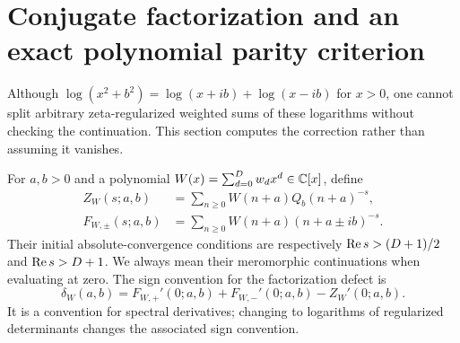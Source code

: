 \section{Conjugate factorization and an exact polynomial parity criterion}
\label{qspec:sec:anomaly}

Although $\log(x^2+b^2)=\log(x+ib)+\log(x-ib)$ for $x>0$, one cannot
split arbitrary zeta-regularized weighted sums of these logarithms without
checking the continuation. This section computes the correction rather
than assuming it vanishes.

For $a,b>0$ and a polynomial $W(x)=\sum_{d=0}^D w_dx^d\in\mathbb C[x]$, define
\begin{align}
Z_W(s;a,b)&=\sum_{n\ge0}W(n+a)Q_b(n+a)^{-s},\label{qspec:eq:weighted-quadratic}\\
F_{W,\pm}(s;a,b)&=\sum_{n\ge0}W(n+a)(n+a\pm ib)^{-s}.
\label{qspec:eq:weighted-linear}
\end{align}
Their initial absolute-convergence conditions are respectively
$\operatorname{Re} s>(D+1)/2$ and $\operatorname{Re} s>D+1$. We always mean their meromorphic
continuations when evaluating at zero. The sign convention for the
factorization defect is
\begin{equation}\label{qspec:eq:delta-definition}
\delta_W(a,b)=F_{W,+}'(0;a,b)+F_{W,-}'(0;a,b)-Z_W'(0;a,b).
\end{equation}
It is a convention for spectral derivatives; changing to logarithms of
regularized determinants changes the associated sign convention.

